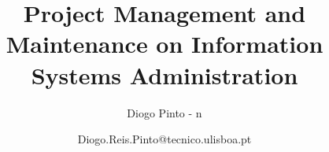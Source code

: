 \documentclass[openany]{./llncs2e/llncs}
\begin{document}
\title{Project Management and Maintenance on Information Systems Administration}
\subtitle{Diogo Pinto - n}
\author{Diogo.Reis.Pinto@tecnico.ulisboa.pt}

\maketitle


\begingroup
\let\cleardoublepage\relax
\let\clearpage\relax
{\def\large{} \def\normalsize{} \tableofcontents}
\endgroup







\newpage
\appendix




% 
% 
 

 
\end{document}
